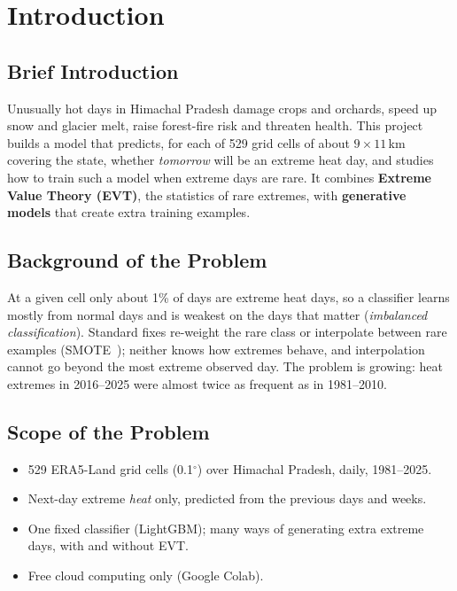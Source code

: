 \documentclass[12pt,a4paper]{report}
\begin{document}
\chapter{Introduction}
\section{Brief Introduction}
Unusually hot days in Himachal Pradesh damage crops and orchards, speed up snow and glacier melt, raise forest-fire
risk and threaten health. This project builds a model that predicts, for each of 529 grid cells of about
$9\times11$\,km covering the state, whether \emph{tomorrow} will be an extreme heat day, and studies how to train such a model when extreme days are rare. It
combines \textbf{Extreme Value Theory (EVT)}, the statistics of rare extremes, with \textbf{generative models} that
create extra training examples.

\section{Background of the Problem}
At a given cell only about 1\% of days are extreme heat days, so a classifier learns mostly from normal days and is
weakest on the days that matter (\emph{imbalanced classification}). Standard fixes re-weight the rare class or
interpolate between rare examples (SMOTE~\cite{chawla2002smote}); neither knows how extremes behave, and interpolation
cannot go beyond the most extreme observed day. The problem is growing: heat extremes in 2016--2025 were almost twice
as frequent as in 1981--2010.

\section{Scope of the Problem}
\begin{itemize}
  \item 529 ERA5-Land grid cells (0.1$^\circ$) over Himachal Pradesh, daily, 1981--2025.
  \item Next-day extreme \emph{heat} only, predicted from the previous days and weeks.
  \item One fixed classifier (LightGBM); many ways of generating extra extreme days, with and without EVT.
  \item Free cloud computing only (Google Colab).
\end{itemize}
\end{document}
